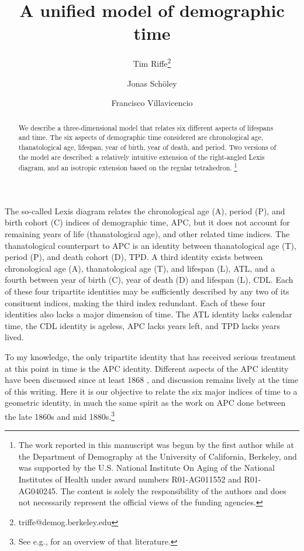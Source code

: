 \documentclass[11pt,oneside]{article} %
\newcommand\ackn[1]{%
  \begingroup
  \renewcommand\thefootnote{}\footnote{#1}%
  \addtocounter{footnote}{-1}%
  \endgroup
}
\begin{document}
\title{A unified model of demographic time}

\author[1]{Tim Riffe\thanks{triffe@demog.berkeley.edu}}
\author[2]{Jonas Sch{\"o}ley}
\author[2]{Francisco Villavicencio}



\maketitle

\begin{abstract}
We describe a three-dimensional model that relates six different aspects of
lifespans and time. The six aspects of demographic time considered are
chronological age, thanatological age, lifespan, year of birth, year of death,
and period. Two versions of the model are described: a relatively intuitive
extension of the right-angled Lexis diagram, and an isotropic extension based on
the regular tetrahedron. \ackn{The work reported in this manuscript was begun by
the first author while at the Department of Demography at the University of
California, Berkeley, and was supported by the U.S.
National Institute On Aging of the National Institutes of Health under award
numbers R01-AG011552 and R01-AG040245. The content is solely the responsibility of the authors and does not necessarily represent the official views of the funding agencies.}

\end{abstract}


The so-called Lexis diagram relates the chronological age (A), period (P), and
birth cohort (C) indices of demographic time, APC, but it does not account
for remaining years of life (thanatological age), and other related time
indices.
The thanatological counterpart to APC is an identity between thanatological age (T), period (P), and death cohort (D), TPD. A third identity exists between
chronological age (A), thanatological age (T), and lifespan (L), ATL, and a
fourth between year of birth (C), year of death (D) and lifespan (L), CDL.
Each of these four tripartite identities may be sufficiently described by any
two of its consituent indices, making the third index redundant. Each of these
four identities also lacks a major dimension of time. The ATL identity lacks
calendar time, the CDL identity is ageless, APC lacks years left, and TPD lacks years lived. 

To my knowledge, the only tripartite identity that has received serious
treatment at this point in time is the APC identity. Different aspects of the
APC identity have been discussed since at least 1868
\citep{knapp1868ermittlung}, and discussion remains lively at the time of this
writing. Here it is our objective to relate the six major indices of time to a
geometric identity, in much the same spirit as the work on APC done
between the late 1860s and mid 1880s.\footnote{See e.g., \citet{keiding2011age}
for an overview of that literature.} 
\end{document}

